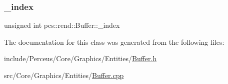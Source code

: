 \subsubsection{\texorpdfstring{\+\_\+index}{\_index}}
{\footnotesize\ttfamily unsigned int pcs\+::rend\+::\+Buffer\+::\+\_\+index\hspace{0.3cm}{\ttfamily [private]}}



The documentation for this class was generated from the following files\+:\begin{DoxyCompactItemize}
\item 
include/\+Perceus/\+Core/\+Graphics/\+Entities/\hyperlink{Buffer_8h}{Buffer.\+h}\item 
src/\+Core/\+Graphics/\+Entities/\hyperlink{Buffer_8cpp}{Buffer.\+cpp}\end{DoxyCompactItemize}
